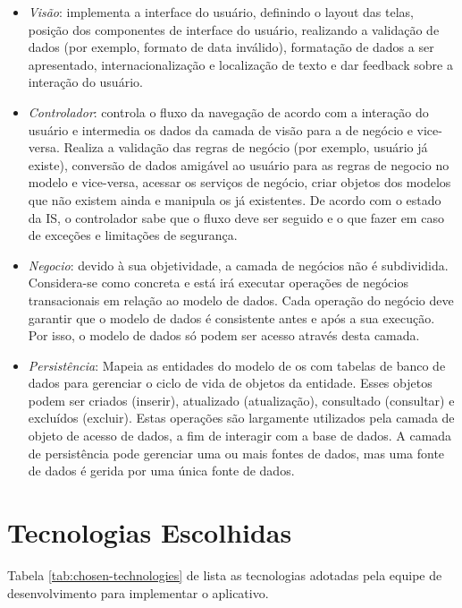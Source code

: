 \documentclass[envcountsame,envcountchap,letterpaper]{svmono}
\begin{document}
\begin{itemize}
\item \textit{Visão}: implementa a interface do usuário, definindo o layout das telas, posição dos componentes de interface do usuário, realizando a validação de dados (por exemplo, formato de data inválido), formatação de dados a ser apresentado, internacionalização e localização de texto e dar feedback sobre a interação do usuário.

\item \textit{Controlador}: controla o fluxo da navegação de acordo com a interação do usuário e intermedia os dados da camada de visão para a de negócio e vice-versa. Realiza a validação das regras de negócio (por exemplo, usuário já existe), conversão de dados amigável ao usuário para as regras de negocio no modelo e vice-versa, acessar os serviços de negócio, criar objetos dos modelos que não existem ainda e manipula os já existentes. De acordo com o estado da IS, o controlador sabe que o fluxo deve ser seguido e o que fazer em caso de exceções e limitações de segurança.

\item \textit{Negocio}: devido à sua objetividade, a camada de negócios não é subdividida. Considera-se como concreta e está irá executar operações de negócios transacionais em relação ao modelo de dados. Cada operação do negócio deve garantir que o modelo de dados é consistente antes e após a sua execução. Por isso, o modelo de dados só podem ser acesso através desta camada.

\item \textit{Persistência}: Mapeia as entidades do modelo de os com tabelas de banco de dados para gerenciar o ciclo de vida de objetos da entidade. Esses objetos podem ser criados (inserir), atualizado (atualização), consultado (consultar) e excluídos (excluir). Estas operações são largamente utilizados pela camada de objeto de acesso de dados, a fim de interagir com a base de dados. A camada de persistência pode gerenciar uma ou mais fontes de dados, mas uma fonte de dados é gerida por uma única fonte de dados.
\end{itemize}

\section{Tecnologias Escolhidas}

Tabela \ref{tab:chosen-technologies} de lista as tecnologias adotadas pela equipe de desenvolvimento para implementar o aplicativo.
\end{document}
